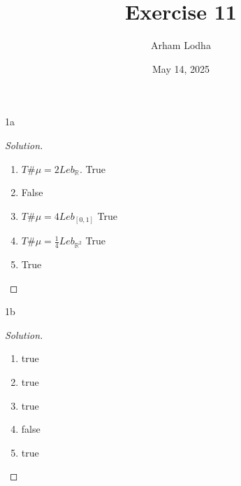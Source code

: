 \documentclass{article}
\newcommand{\R}{\mathbb{R}}
\newenvironment{solution}
{\renewcommand\qedsymbol{$\blacksquare$}\begin{proof}[Solution]}
{\end{proof}}
\begin{document}
\title{Exercise 11}
\author{Arham Lodha}%
\date{May 14, 2025}%
\maketitle

\begin{PROB}{1a}\label{Problem 1a.}
\end{PROB}
\begin{solution}
    \begin{enumerate}
        \item $T \# \mu = 2 Leb_{\R}$. True
        \item False 
        \item $T \# \mu = 4 Leb_{[0, 1]}$ True
        \item  $T \# \mu = \frac{1}{4}Leb_{\R^2}$ True
        \item True 
    \end{enumerate}
\end{solution}

\begin{PROB}{1b}\label{Problem 1b.}
\end{PROB}
\begin{solution}
    \begin{enumerate}
        \item true
        \item true
        \item true
        \item false
        \item true
    \end{enumerate}
\end{solution}

\bigskip
\end{document}
